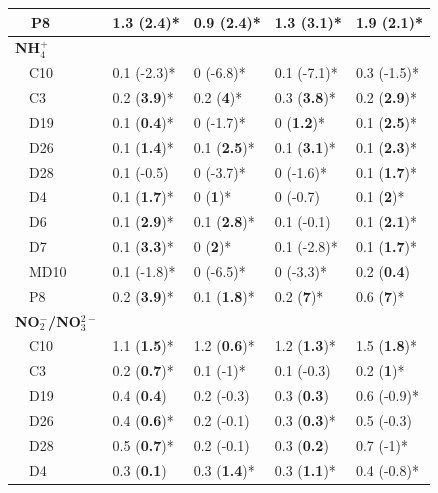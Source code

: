 \documentclass[letterpaper,12pt,oneside]{article}\usepackage[]{graphicx}\usepackage[]{color}
\begin{document}
\begin{table}[!tbp]
\begin{center}
\begin{tabular}{lllll}
~~P8&1.3 \footnotesize{(\textbf{2.4})*}&0.9 \footnotesize{(\textbf{2.4})*}&1.3 \footnotesize{(\textbf{3.1})*}&1.9 \footnotesize{(\textbf{2.1})*}\tabularnewline
\hline
{\bfseries NH$_{4}^{+}$}&&&&\tabularnewline
~~C10&0.1 \footnotesize{(-2.3)*}&0 \footnotesize{(-6.8)*}&0.1 \footnotesize{(-7.1)*}&0.3 \footnotesize{(-1.5)*}\tabularnewline
~~C3&0.2 \footnotesize{(\textbf{3.9})*}&0.2 \footnotesize{(\textbf{4})*}&0.3 \footnotesize{(\textbf{3.8})*}&0.2 \footnotesize{(\textbf{2.9})*}\tabularnewline
~~D19&0.1 \footnotesize{(\textbf{0.4})*}&0 \footnotesize{(-1.7)*}&0 \footnotesize{(\textbf{1.2})*}&0.1 \footnotesize{(\textbf{2.5})*}\tabularnewline
~~D26&0.1 \footnotesize{(\textbf{1.4})*}&0.1 \footnotesize{(\textbf{2.5})*}&0.1 \footnotesize{(\textbf{3.1})*}&0.1 \footnotesize{(\textbf{2.3})*}\tabularnewline
~~D28&0.1 \footnotesize{(-0.5)}&0 \footnotesize{(-3.7)*}&0 \footnotesize{(-1.6)*}&0.1 \footnotesize{(\textbf{1.7})*}\tabularnewline
~~D4&0.1 \footnotesize{(\textbf{1.7})*}&0 \footnotesize{(\textbf{1})*}&0 \footnotesize{(-0.7)}&0.1 \footnotesize{(\textbf{2})*}\tabularnewline
~~D6&0.1 \footnotesize{(\textbf{2.9})*}&0.1 \footnotesize{(\textbf{2.8})*}&0.1 \footnotesize{(-0.1)}&0.1 \footnotesize{(\textbf{2.1})*}\tabularnewline
~~D7&0.1 \footnotesize{(\textbf{3.3})*}&0 \footnotesize{(\textbf{2})*}&0.1 \footnotesize{(-2.8)*}&0.1 \footnotesize{(\textbf{1.7})*}\tabularnewline
~~MD10&0.1 \footnotesize{(-1.8)*}&0 \footnotesize{(-6.5)*}&0 \footnotesize{(-3.3)*}&0.2 \footnotesize{(\textbf{0.4})}\tabularnewline
~~P8&0.2 \footnotesize{(\textbf{3.9})*}&0.1 \footnotesize{(\textbf{1.8})*}&0.2 \footnotesize{(\textbf{7})*}&0.6 \footnotesize{(\textbf{7})*}\tabularnewline
\hline
{\bfseries NO$_{2}^{-}$/NO$_{3}^{2-}$}&&&&\tabularnewline
~~C10&1.1 \footnotesize{(\textbf{1.5})*}&1.2 \footnotesize{(\textbf{0.6})*}&1.2 \footnotesize{(\textbf{1.3})*}&1.5 \footnotesize{(\textbf{1.8})*}\tabularnewline
~~C3&0.2 \footnotesize{(\textbf{0.7})*}&0.1 \footnotesize{(-1)*}&0.1 \footnotesize{(-0.3)}&0.2 \footnotesize{(\textbf{1})*}\tabularnewline
~~D19&0.4 \footnotesize{(\textbf{0.4})}&0.2 \footnotesize{(-0.3)}&0.3 \footnotesize{(\textbf{0.3})}&0.6 \footnotesize{(-0.9)*}\tabularnewline
~~D26&0.4 \footnotesize{(\textbf{0.6})*}&0.2 \footnotesize{(-0.1)}&0.3 \footnotesize{(\textbf{0.3})*}&0.5 \footnotesize{(-0.3)}\tabularnewline
~~D28&0.5 \footnotesize{(\textbf{0.7})*}&0.2 \footnotesize{(-0.1)}&0.3 \footnotesize{(\textbf{0.2})}&0.7 \footnotesize{(-1)*}\tabularnewline
~~D4&0.3 \footnotesize{(\textbf{0.1})}&0.3 \footnotesize{(\textbf{1.4})*}&0.3 \footnotesize{(\textbf{1.1})*}&0.4 \footnotesize{(-0.8)*}\tabularnewline

\end{tabular}
\end{center}
\end{table}
\end{document}
